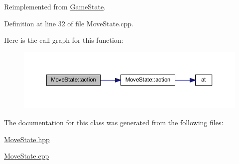 Reimplemented from \hyperlink{class_game_state_aea56de0bb65f0449dbf2485557067338}{Game\-State}.



Definition at line 32 of file Move\-State.\-cpp.



Here is the call graph for this function\-:\nopagebreak
\begin{figure}[H]
\begin{center}
\leavevmode
\includegraphics[width=350pt]{class_move_state_ad6e5d56d2634aa592c8e5fdc32fd0ce7_cgraph}
\end{center}
\end{figure}




The documentation for this class was generated from the following files\-:\begin{DoxyCompactItemize}
\item 
\hyperlink{_move_state_8hpp}{Move\-State.\-hpp}\item 
\hyperlink{_move_state_8cpp}{Move\-State.\-cpp}\end{DoxyCompactItemize}
